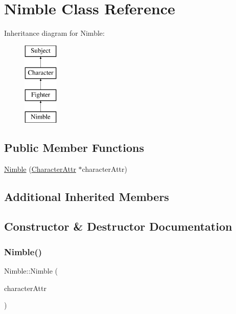 \hypertarget{class_nimble}{}\section{Nimble Class Reference}
\label{class_nimble}
Inheritance diagram for Nimble\+:\begin{figure}[H]
\begin{center}
\leavevmode
\includegraphics[height=4.000000cm]{class_nimble}
\end{center}
\end{figure}
\subsection*{Public Member Functions}
\begin{DoxyCompactItemize}
\item 
\hyperlink{class_nimble_a897ccb945ef6809852e7f34c7535a651}{Nimble} (\hyperlink{class_character_attr}{Character\+Attr} $\ast$character\+Attr)
\end{DoxyCompactItemize}
\subsection*{Additional Inherited Members}


\subsection{Constructor \& Destructor Documentation}
\hypertarget{class_nimble_a897ccb945ef6809852e7f34c7535a651}{}\label{class_nimble_a897ccb945ef6809852e7f34c7535a651} 
\subsubsection{\texorpdfstring{Nimble()}{Nimble()}}
{\footnotesize\ttfamily Nimble\+::\+Nimble (\begin{DoxyParamCaption}\item[{\hyperlink{class_character_attr}{Character\+Attr} $\ast$}]{character\+Attr }\end{DoxyParamCaption})}

